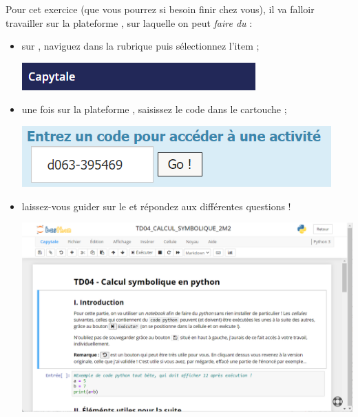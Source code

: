 \documentclass[a4paper,11pt]{article}
\begin{document}
\medskip


\medskip

Pour cet exercice (que vous pourrez si besoin finir chez vous), il va falloir travailler sur la plateforme , sur laquelle on peut \textit{faire du} \calgpython{} :
%
\begin{itemize}
	\item sur , naviguez dans la rubrique  puis sélectionnez l'item  ;
	\begin{center}
		\includegraphics[scale=0.5]{td04_capent}
	\end{center}
	\item une fois sur la plateforme , saisissez le code  dans le cartouche  ;
	\begin{center}
		\includegraphics[scale=0.5]{td04_capcode}
	\end{center}
	\item laissez-vous guider sur le  et répondez aux différentes questions !
	\begin{center}
		\includegraphics[scale=0.5]{td04_capcap}
	\end{center}
\end{itemize}

\medskip
\end{document}
